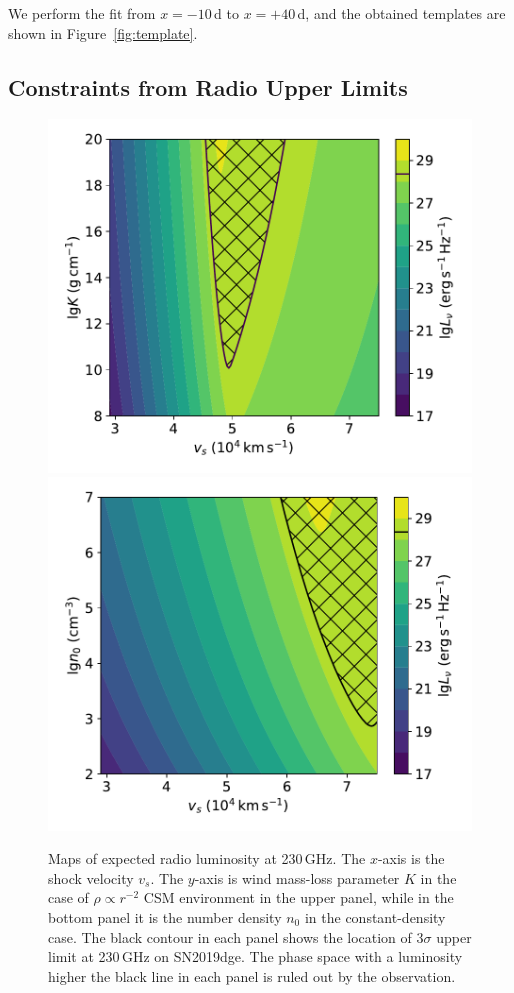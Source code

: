 \documentclass[twocolumn]{aastex63}
\newcommand{\name}{SN2019dge}
\begin{document}
We perform the fit from $x=-10$\,d to $x=+40$\,d, and the obtained templates are shown in 
Figure~\ref{fig:template}.

\subsection{Constraints from Radio Upper Limits}\label{subsec:radio}
\begin{figure}[htbp!]
	\centering
	\includegraphics[width=\columnwidth]{figures/radio_230GHz_s2.pdf}
	\includegraphics[width=\columnwidth]{figures/radio_230GHz_s0.pdf}
	\caption{Maps of expected radio luminosity at 230\,GHz. The $x$-axis is the shock velocity $v_s$. 
		The $y$-axis is wind mass-loss parameter $K$ in the case of $\rho \propto r^{-2}$ 
		CSM environment in the upper panel, while in the bottom panel it is the number density $n_0$ in 
		the 
		constant-density case. The black contour in each panel shows the location of 3$\sigma$ upper 
		limit 
		at 230\,GHz on \name. The phase space with a luminosity higher the black line in each panel is 
		ruled 
		out by the 
		observation.
		\label{fig:radio}}
\end{figure}
\end{document}

